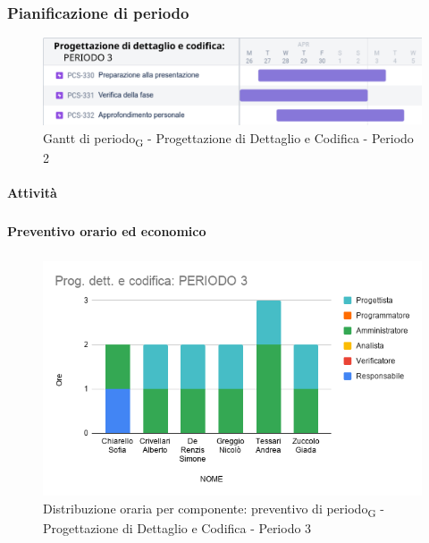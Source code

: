 \subsubsection{Pianificazione di periodo}


\begin{figure}[H]
	\centering
	\includegraphics[scale=0.60]{res/images/gantt_periodo/progdett_3_gantt.png}
	\caption{Gantt di periodo\textsubscript{G} - Progettazione di Dettaglio e Codifica - Periodo 2}
\end{figure}

\paragraph{Attività}
\subparagraph*{}

\planningTable{
	
}



\paragraph{Preventivo orario ed economico}
\subparagraph*{}

\contabilitaTable{
	
}

\begin{figure}[H]
	\centering
	\includegraphics[scale=0.6]{res/images/charts/preventivo/prog_dett_3.png}
	\caption{Distribuzione oraria per componente: preventivo di periodo\textsubscript{G} - Progettazione di Dettaglio e Codifica - Periodo 3}
\end{figure}



